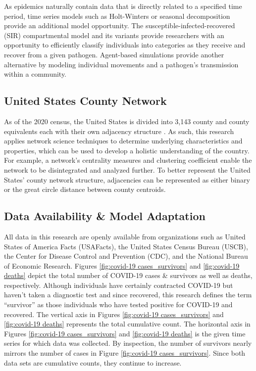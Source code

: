 As epidemics naturally contain data that is directly related to a specified time period, time series models such as Holt-Winters or seasonal decomposition provide an additional model opportunity.  The susceptible-infected-recovered (SIR) compartmental model and its variants provide researchers with an opportunity to efficiently classify individuals into categories as they receive and recover from a given pathogen.  Agent-based simulations provide another alternative by modeling individual movements and a pathogen's transmission within a community.

\subsection{United States County Network}
As of the 2020 census, the United States is divided into 3,143 county and county equivalents each with their own adjacency structure \cite{UCSBcounties}.  As such, this research applies network science techniques to determine underlying characteristics and properties, which can be used to develop a holistic understanding of the country.  For example, a network's centrality measures and clustering coefficient enable the network to be disintegrated and analyzed further.  To better represent the United States' county network structure, adjacencies can be represented as either binary or the great circle distance between county centroids.  

\subsection{Data Availability \& Model Adaptation}
All data in this research are openly available from organizations such as United States of America Facts (USAFacts), the United States Census Bureau (USCB), the Center for Disease Control and Prevention (CDC), and the National Bureau of Economic Research.  Figures \ref{fig:covid-19 cases_survivors} and \ref{fig:covid-19 deaths} depict the total number of COVID-19 cases \& survivors as well as deaths, respectively.  Although individuals have certainly contracted COVID-19 but haven't taken a diagnostic test and since recovered, this research defines the term ``survivor'' as those individuals who have tested positive for COVID-19 and recovered.  The vertical axis in Figures \ref{fig:covid-19 cases_survivors} and \ref{fig:covid-19 deaths} represents the total cumulative count.  The horizontal axis in Figures \ref{fig:covid-19 cases_survivors} and \ref{fig:covid-19 deaths} is the given time series for which data was collected.  By inspection, the number of survivors nearly mirrors the number of cases in Figure \ref{fig:covid-19 cases_survivors}.  Since both data sets are cumulative counts, they continue to increase.

